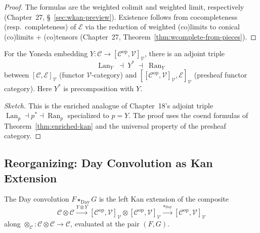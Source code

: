 \begin{proof}
The formulas are the weighted colimit and weighted limit, respectively
(Chapter~27, \S~\ref{sec:wkan-preview}). Existence follows from cocompleteness
(resp.\ completeness) of $\mathcal{E}$ via the reduction of weighted
(co)limits to conical (co)limits + (co)tensors (Chapter~27, Theorem~\ref{thm:wcomplete-from-pieces}).
\end{proof}

\begin{theorem}
\label{thm:kan-triple-along-yoneda}
For the Yoneda embedding $Y : \mathcal{C} \to [\mathcal{C}^{\mathrm{op}},
\mathcal{V}]_\mathcal{V}$, there is an adjoint triple
\begin{equation*}
  \operatorname{Lan}_Y \;\dashv\; Y^* \;\dashv\; \operatorname{Ran}_Y
\end{equation*}
between $[\mathcal{C}, \mathcal{E}]_\mathcal{V}$ (functor $\mathcal{V}$-category)
and $[[\mathcal{C}^{\mathrm{op}}, \mathcal{V}]_\mathcal{V}, \mathcal{E}]_\mathcal{V}$
(presheaf functor category). Here $Y^*$ is precomposition with $Y$.
\end{theorem}

\begin{proof}[Sketch]
This is the enriched analogue of Chapter~18's adjoint triple
$\operatorname{Lan}_p \dashv p^* \dashv \operatorname{Ran}_p$ specialized to
$p = Y$. The proof uses the coend formulas of Theorem~\ref{thm:enriched-kan}
and the universal property of the presheaf category.
\end{proof}

\subsection{Reorganizing: Day Convolution as Kan Extension}

\begin{proposition}
\label{prop:day-as-lan}
The Day convolution $F \star_{\mathrm{Day}} G$ is the left Kan extension of
the composite
\begin{equation*}
  \mathcal{C} \otimes \mathcal{C} \xrightarrow{Y \otimes Y}
  [\mathcal{C}^{\mathrm{op}}, \mathcal{V}]_\mathcal{V} \otimes [\mathcal{C}^{\mathrm{op}},
  \mathcal{V}]_\mathcal{V} \xrightarrow{\star_{\mathrm{Day}}}
  [\mathcal{C}^{\mathrm{op}}, \mathcal{V}]_\mathcal{V}
\end{equation*}
along $\otimes_\mathcal{C} : \mathcal{C} \otimes \mathcal{C} \to \mathcal{C}$,
evaluated at the pair $(F, G)$.
\end{proposition}

